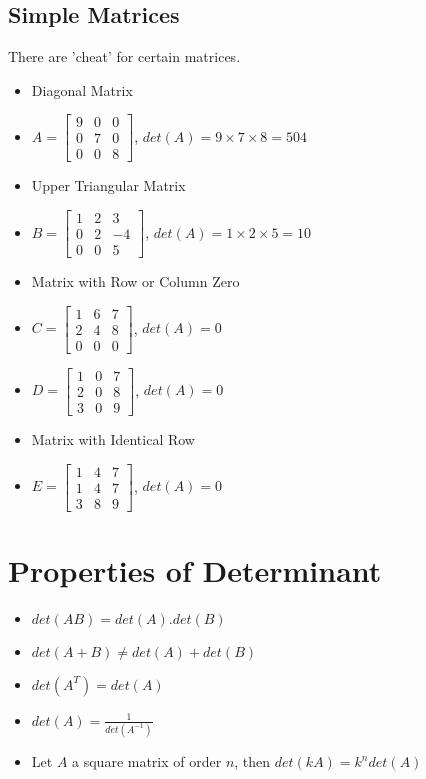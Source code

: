 \documentclass[a4paper,12pt]{article}
\begin{document}
\subsection*{Simple Matrices}
There are 'cheat' for certain matrices.
\begin{itemize}
  \item Diagonal Matrix
  \item[] \(A=\begin{bmatrix}
      9 & 0 & 0 \\ 0 & 7 & 0 \\ 0 & 0 & 8
    \end{bmatrix}\), \(det(A)=9\times 7\times 8=504\)
  \item Upper Triangular Matrix
  \item[] \(B=\begin{bmatrix}
      1 & 2 & 3 \\ 0 & 2 & -4 \\ 0 & 0 & 5
    \end{bmatrix}\), \(det(A)=1\times 2\times 5=10\)
  \item Matrix with Row or Column Zero
  \item[] \(C=\begin{bmatrix}
      1 & 6 & 7 \\ 2 & 4 & 8\\ 0 & 0 & 0
    \end{bmatrix}\), \(det(A)=0\)
  \item[] \(D=\begin{bmatrix}
      1 & 0 & 7 \\ 2 & 0 & 8\\ 3 & 0 & 9
    \end{bmatrix}\), \(det(A)=0\)
  \item Matrix with Identical Row
  \item[] \(E=\begin{bmatrix}
      1 & 4 & 7 \\ 1 & 4 &7\\ 3 & 8 & 9
    \end{bmatrix}\), \(det(A)=0\)
\end{itemize}

\section*{Properties of Determinant}
\begin{itemize}
  \item \(det(AB)=det(A).det(B)\)
  \item \(det(A+B)\neq det(A)+det(B)\)
  \item \(det(A^T)=det(A)\)
  \item \(det(A)=\frac{1}{det(A^{-1})}\)
  \item Let \(A\) a square matrix of order \(n\), then \(det(kA)=k^n det(A)\)
\end{itemize}
\end{document}
